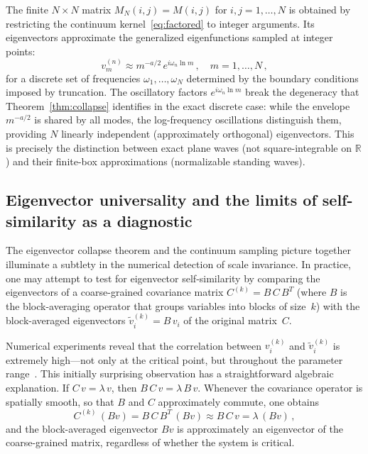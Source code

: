 \documentclass[12pt]{article}
\begin{document}
The finite $N \times N$ matrix $M_N(i,j) = M(i,j)$ for $i,j = 1, \ldots, N$ is obtained by restricting the continuum kernel~\eqref{eq:factored} to integer arguments. Its eigenvectors approximate the generalized eigenfunctions sampled at integer points:
\begin{equation}\label{eq:sampling}
v^{(n)}_m \approx m^{-a/2}\, e^{i\omega_n \ln m}\,, \quad m = 1, \ldots, N\,,
\end{equation}
for a discrete set of frequencies $\omega_1, \ldots, \omega_N$ determined by the boundary conditions imposed by truncation. The oscillatory factors $e^{i\omega_n \ln m}$ break the degeneracy that Theorem~\ref{thm:collapse} identifies in the exact discrete case: while the envelope $m^{-a/2}$ is shared by all modes, the log-frequency oscillations distinguish them, providing $N$ linearly independent (approximately orthogonal) eigenvectors. This is precisely the distinction between exact plane waves (not square-integrable on $\mathbb{R}$) and their finite-box approximations (normalizable standing waves).


\subsection{Eigenvector universality and the limits of self-similarity as a diagnostic}\label{sec:commutation}

The eigenvector collapse theorem and the continuum sampling picture together illuminate a subtlety in the numerical detection of scale invariance. In practice, one may attempt to test for eigenvector self-similarity by comparing the eigenvectors of a coarse-grained covariance matrix $C^{(k)} = B\, C\, B^T$ (where $B$ is the block-averaging operator that groups variables into blocks of size~$k$) with the block-averaged eigenvectors $\tilde{v}_i^{(k)} = B\, v_i$ of the original matrix~$C$.

Numerical experiments reveal that the correlation between $v_i^{(k)}$ and $\tilde{v}_i^{(k)}$ is extremely high---not only at the critical point, but throughout the parameter range~\cite{msi2026}. This initially surprising observation has a straightforward algebraic explanation. If $C\, v = \lambda\, v$, then $B\, C\, v = \lambda\, B\, v$. Whenever the covariance operator is spatially smooth, so that $B$ and $C$ approximately commute, one obtains
\[
C^{(k)}\, (Bv) = B\, C\, B^T\, (Bv) \approx B\, C\, v = \lambda\, (Bv)\,,
\]
and the block-averaged eigenvector $Bv$ is approximately an eigenvector of the coarse-grained matrix, regardless of whether the system is critical.
\end{document}
